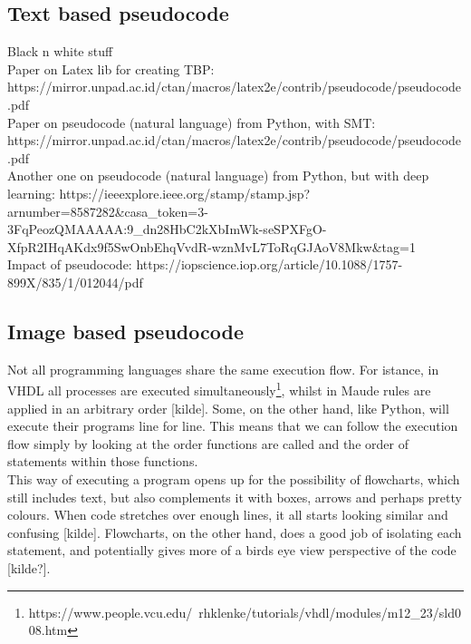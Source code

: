\subsection{Text based pseudocode}

Black n white stuff \hfill \\

Paper on Latex lib for creating TBP: https://mirror.unpad.ac.id/ctan/macros/latex2e/contrib/pseudocode/pseudocode.pdf \\

Paper on pseudocode (natural language) from Python, with SMT: https://mirror.unpad.ac.id/ctan/macros/latex2e/contrib/pseudocode/pseudocode.pdf \\

Another one on pseudocode (natural language) from Python, but with deep learning: https://ieeexplore.ieee.org/stamp/stamp.jsp?arnumber=8587282\&casa\_token=3-3FqPeozQMAAAAA:9\_dn28HbC2kXbImWk-seSPXFgO-XfpR2IHqAKdx9f5SwOnbEhqVvdR-wznMvL7ToRqGJAoV8Mkw\&tag=1 \\

Impact of pseudocode: https://iopscience.iop.org/article/10.1088/1757-899X/835/1/012044/pdf

\subsection{Image based pseudocode}

Not all programming languages share the same execution flow. For istance, in VHDL all processes are executed simultaneously\footnote{https://www.people.vcu.edu/~rhklenke/tutorials/vhdl/modules/m12\_23/sld008.htm}, whilst in Maude rules are applied in an arbitrary order [kilde]. Some, on the other hand, like Python, will execute their programs line for line. This means that we can follow the execution flow simply by looking at the order functions are called and the order of statements within those functions. \hfill \\

This way of executing a program opens up for the possibility of flowcharts, which still includes text, but also complements it with boxes, arrows and perhaps pretty colours. When code stretches over enough lines, it all starts looking similar and confusing [kilde]. Flowcharts, on the other hand, does a good job of isolating each statement, and potentially gives more of a birds eye view perspective of the code [kilde?]. \hfill \\

